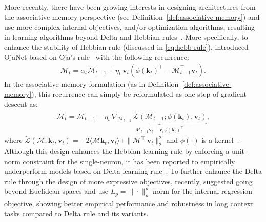 \documentclass{article}
\newcommand{\vv}{\mathbf{v}}
\newcommand{\citep}{\parencite}
\newcommand{\citet}{\textcite}
\newcommand{\undermath}[2]{\underset{#1}{\underbrace{#2}}}
\newcommand{\inner}[2]{\langle #1, #2 \rangle}
\newcommand{\M}[0]{\mathcal{M}}
\newcommand{\head}[1]{\vspace{1.7mm}\noindent{{\textcolor{c4}{\bf #1.}}}}
\newcommand{\vk}{\boldsymbol{k}}
\renewcommand{\vv}{\boldsymbol{v}}
\begin{document}
{\head{Beyond Conventional Learning Rules: Omega, Oja’s, and Non-Euclidean Learning Rules}
More recently, there have been growing interests in designing architectures from the associative memory perspective (see Definition~\ref{def:associative-memory}) and use more complex internal objectives, and/or optimization algorithms, resulting in learning algorithms beyond Delta and Hebbian rules~\citep{behrouz2025Miras, irie2022neural, behrouz2025atlas, von2023uncovering, zhang2025higher}. More specifically, to enhance the stability of Hebbian rule (discussed in \autoref{eq:hebb-rule}), \citet{irie2022neural} introduced OjaNet based on Oja's rule~\citep{oja1982simplified} with the following recurrence:
\begin{align}
    \M_t = \alpha_t \M_{t-1} + \eta_t \: \vv_t  \left(\phi(\vk_t)^{\top}  - \M_{t-1}^{\top} \vv_t \right).
\end{align}
In the associative memory formulation (as in Definition~\ref{def:associative-memory}), this recurrence can simply be reformulated as one step of gradient descent as:
\begin{align}
    \M_t = \M_{t-1} - \eta_t \: \undermath{\M_{t-1}^{\top} \vv_t - \vv_t \phi(\vk_t)^{\top}}{\nabla_{\M_{t-1}} \: \tilde{\mathcal{L}}\left( \M_{t-1}; \phi\left(\vk_t\right), \vv_t \right)},
\end{align}
where $\tilde{\mathcal{L}}(\M; \vk_t, \vv_t) = -2 \inner{\M \vk_t}{\vv_t} + \|\M^{\top} \: \vv_t\|^2_2$ and $\phi(\cdot)$ is a kernel~\citep{irie2022neural, irie2025fast}. Although this design enhances the Hebbian learning rule by enforcing a unit-norm constraint for the single-neuron, it has been reported to empirically underperform models based on Delta learning rule~\citep{irie2022neural}. To further enhance the Delta rule through the design of more expressive objectives, recently, \citet{behrouz2025Miras} suggested going beyond Euclidean spaces and use $L_p = \|\cdot\|_p^{p}$ norm for the internal regression objective, showing better empirical performance and robustness in long context tasks compared to Delta rule and its variants. 

}
\end{document}
